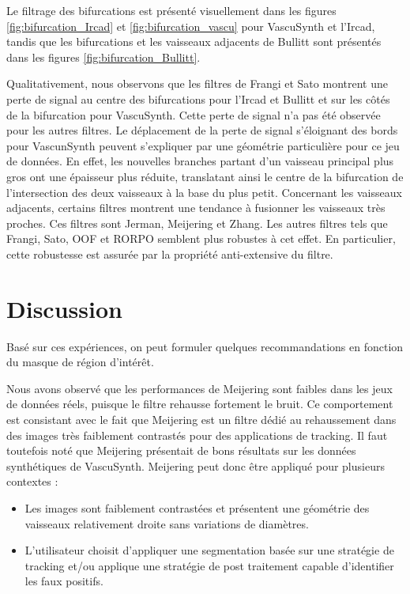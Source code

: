 Le filtrage des bifurcations est présenté visuellement dans les figures \ref{fig:bifurcation_Ircad} et \ref{fig:bifurcation_vascu} pour VascuSynth et l'Ircad, tandis que les bifurcations et les vaisseaux adjacents de Bullitt sont présentés dans les figures \ref{fig:bifurcation_Bullitt}.

Qualitativement, nous observons que les filtres de Frangi et Sato montrent une perte de signal au centre des bifurcations pour l'Ircad et Bullitt et sur les côtés de la bifurcation pour VascuSynth. Cette perte de signal n'a pas été observée pour les autres filtres. Le déplacement de la perte de signal s'éloignant des bords pour VascunSynth peuvent s'expliquer par une géométrie particulière pour ce jeu de données. En effet, les nouvelles branches partant d'un vaisseau principal plus gros ont une épaisseur plus réduite, translatant ainsi le centre de la bifurcation de l'intersection des deux vaisseaux à la base du plus petit. Concernant les vaisseaux adjacents, certains filtres montrent une tendance à fusionner les vaisseaux très proches. Ces filtres sont Jerman, Meijering et Zhang. Les autres filtres tels que Frangi, Sato, OOF et RORPO semblent plus robustes à cet effet. En particulier, cette robustesse est assurée par la propriété anti-extensive du filtre.

\section{Discussion}

Basé sur ces expériences, on peut formuler quelques recommandations en fonction du masque de région d'intérêt.

Nous avons observé que les performances de Meijering sont faibles dans les jeux de données réels, puisque le filtre rehausse fortement le bruit. Ce comportement est consistant avec le fait que Meijering est un filtre dédié au rehaussement dans des images très faiblement contrastés pour des applications de tracking. Il faut toutefois noté que Meijering présentait de bons résultats sur les données synthétiques de VascuSynth. Meijering peut donc être appliqué pour plusieurs contextes :

\begin{itemize}
  \item Les images sont faiblement contrastées et présentent une géométrie des vaisseaux relativement droite sans variations de diamètres.
  \item L'utilisateur choisit d'appliquer une segmentation basée sur une stratégie de tracking et/ou applique une stratégie de post traitement capable d'identifier les faux positifs.
\end{itemize}


